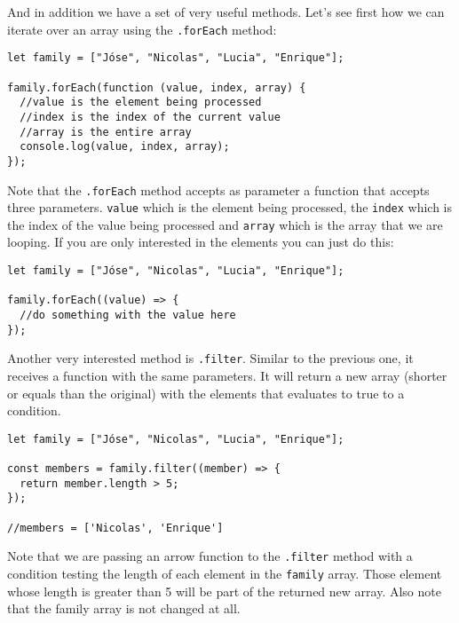 \documentclass[a4paper, oneside, titlepage, 12pt]{book}
\begin{document}
And in addition we have a set of very useful methods. Let's see first how we can iterate over an array using the \texttt{.forEach} method:               
               
\begin{verbatim}
let family = ["Jóse", "Nicolas", "Lucia", "Enrique"];

family.forEach(function (value, index, array) {
  //value is the element being processed
  //index is the index of the current value
  //array is the entire array
  console.log(value, index, array);
});
\end{verbatim}

Note that the \texttt{.forEach} method accepts as parameter a function that accepts three parameters. \texttt{value} which is the element being processed, the \texttt{index} which is the index of the value being processed and \texttt{array} which is the array that we are looping. If you are only interested in the elements you can just do this:

\begin{verbatim}
let family = ["Jóse", "Nicolas", "Lucia", "Enrique"];

family.forEach((value) => {
  //do something with the value here	
});
\end{verbatim}

Another very interested method is \texttt{.filter}. Similar to the previous one, it receives a function with the same parameters. It will return a new array (shorter or equals than the original) with the elements that evaluates to true to a condition.

\begin{verbatim}
let family = ["Jóse", "Nicolas", "Lucia", "Enrique"];

const members = family.filter((member) => {
  return member.length > 5;
});

//members = ['Nicolas', 'Enrique']
\end{verbatim}

Note that we are passing an arrow function to the \texttt{.filter} method with a condition testing the length of each element in the \texttt{family} array. Those element whose length is greater than 5 will be part of the returned new array. Also note that the family array is not changed at all.
\end{document}

